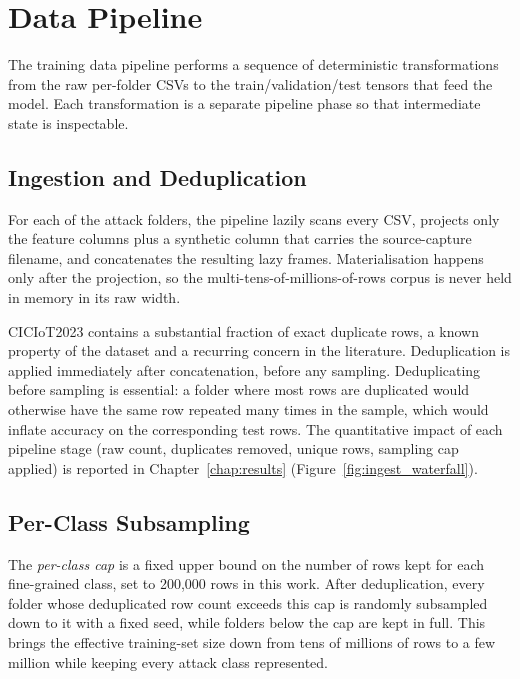 \section{Data Pipeline}
\label{sec:data_pipeline_design}

\par The training data pipeline performs a sequence of deterministic transformations from the raw per-folder CSVs to the train/validation/test tensors that feed the model. Each transformation is a separate pipeline phase so that intermediate state is inspectable.

\subsection{Ingestion and Deduplication}
\label{subsec:ingestion}

\par For each of the attack folders, the pipeline lazily scans every CSV, projects only the feature columns plus a synthetic column that carries the source-capture filename, and concatenates the resulting lazy frames. Materialisation happens only after the projection, so the multi-tens-of-millions-of-rows corpus is never held in memory in its raw width.

\par CICIoT2023 contains a substantial fraction of exact duplicate rows, a known property of the dataset and a recurring concern in the literature. Deduplication is applied immediately after concatenation, before any sampling. Deduplicating before sampling is essential: a folder where most rows are duplicated would otherwise have the same row repeated many times in the sample, which would inflate accuracy on the corresponding test rows. The quantitative impact of each pipeline stage (raw count, duplicates removed, unique rows, sampling cap applied) is reported in Chapter~\ref{chap:results} (Figure~\ref{fig:ingest_waterfall}).

\subsection{Per-Class Subsampling}
\label{subsec:subsampling}

\par The \emph{per-class cap} is a fixed upper bound on the number of rows kept for each fine-grained class, set to 200{,}000 rows in this work. After deduplication, every folder whose deduplicated row count exceeds this cap is randomly subsampled down to it with a fixed seed, while folders below the cap are kept in full. This brings the effective training-set size down from tens of millions of rows to a few million while keeping every attack class represented.


